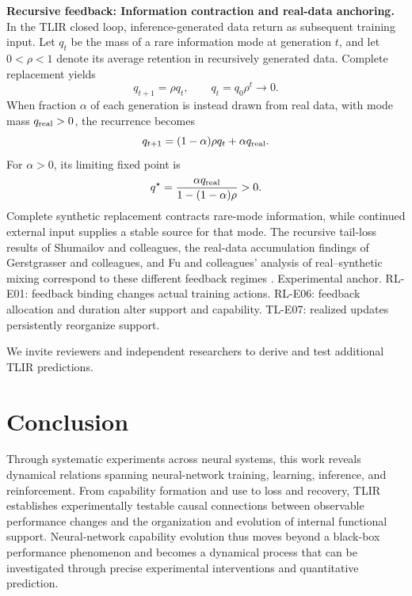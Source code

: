 \documentclass[12pt,letterpaper]{article}
\begin{document}
\medskip\noindent\textbf{Recursive feedback: Information contraction and real-data anchoring.}
In the TLIR closed loop, inference-generated data return as subsequent training input. Let $q_t$ be the mass of a rare information mode at generation $t$, and let $0<\rho<1$ denote its average retention in recursively generated data. Complete replacement yields
\[
q_{t+1}=\rho q_t,\qquad q_t=q_0\rho^t\longrightarrow0.
\]
When fraction $\alpha$ of each generation is instead drawn from real data, with mode mass $q_{\rm real}>0$, the recurrence becomes
\begin{equation}
 q_{t+1}=(1-\alpha)\rho q_t+\alpha q_{\rm real}.
 \label{eq:feedback}
\end{equation}
For $\alpha>0$, its limiting fixed point is
\[
q^\star=\frac{\alpha q_{\rm real}}{1-(1-\alpha)\rho}>0.
\]
Complete synthetic replacement contracts rare-mode information, while continued external input supplies a stable source for that mode. The recursive tail-loss results of Shumailov and colleagues, the real-data accumulation findings of Gerstgrasser and colleagues, and Fu and colleagues' analysis of real--synthetic mixing correspond to these different feedback regimes \cite{shumailov2024,gerstgrasser2024,fu2024}.
Experimental anchor. RL-E01: feedback binding changes actual training actions. RL-E06: feedback allocation and duration alter support and capability. TL-E07: realized updates persistently reorganize support.

We invite reviewers and independent researchers to derive and test additional TLIR predictions.

\section{Conclusion}
Through systematic experiments across neural systems, this work reveals dynamical relations spanning neural-network training, learning, inference, and reinforcement. From capability formation and use to loss and recovery, TLIR establishes experimentally testable causal connections between observable performance changes and the organization and evolution of internal functional support. Neural-network capability evolution thus moves beyond a black-box performance phenomenon and becomes a dynamical process that can be investigated through precise experimental interventions and quantitative prediction.
\end{document}
